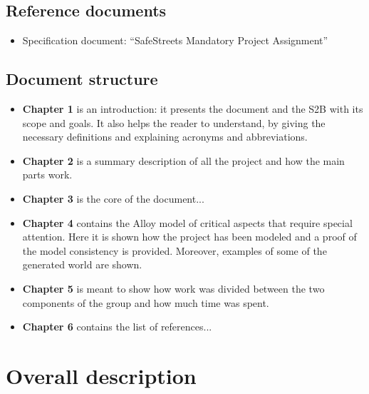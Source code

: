 \documentclass[12pt,a4paper]{report}
\begin{document}
	\section{Reference documents}
	\begin{itemize}
	\item {Specification document}: ``SafeStreets Mandatory Project Assignment''
	\end{itemize}

	\section{Document structure}
	\begin{itemize}
	\item \textbf{Chapter 1} is an introduction: it presents the document and the S2B with its scope and goals. It also helps the reader to understand, by giving the necessary definitions and explaining acronyms and abbreviations. 
	\item \textbf{Chapter 2} is a summary description of all the project and how the main parts work. %
	\item \textbf{Chapter 3} is the core of the document...
	\item \textbf{Chapter 4} contains the Alloy model of critical aspects that require special attention. Here it is shown how the project has been modeled and a proof of the model consistency is provided. Moreover, examples of some of the generated world are shown.
	\item \textbf{Chapter 5} is meant to show how work was divided between the two components of the group and how much time was spent.
	\item \textbf{Chapter 6} contains the list of references...
	\end{itemize}


\chapter{Overall description}
\end{document}
